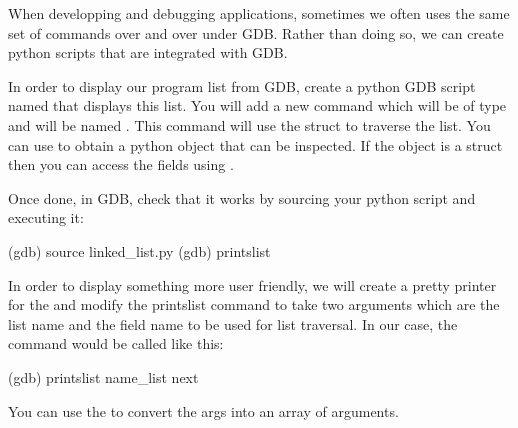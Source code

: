 When developping and debugging applications, sometimes we often uses the same
set of commands over and over under GDB. Rather than doing so, we can create 
python scripts that are integrated with GDB.

In order to display our program list from GDB, create a python GDB script named
 that displays this list. You will add a new command which
will be of type  and will be named . This
command will use the  struct to traverse the list. You can use
 to obtain a python 
object that can be inspected. If the object is a struct then you can access
the fields using .

Once done, in GDB, check that it works by sourcing your python script and
executing it:

\begin{bashinput}
(gdb) source linked_list.py
(gdb) printslist
\end{bashinput}

In order to display something more user friendly, we will create a pretty
printer for the  and modify the printslist command to take
two arguments which are the list name and the field name to be used for list
traversal. In our case, the command would be called
like this:

\begin{bashinput}
(gdb) printslist name_list next
\end{bashinput}

You can use the  to convert the args into an
array of arguments.